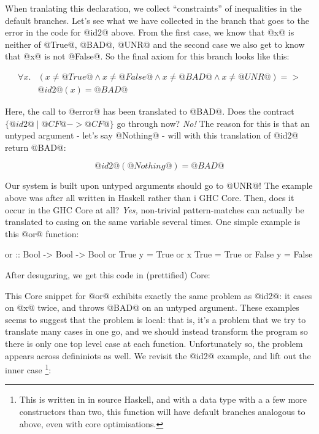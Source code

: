 When tranlating this declaration, we collect ``constraints'' of
inequalities in the default branches. Let's see what we have collected
in the branch that goes to the error in the code for @id2@ above.
From the first case, we know that @x@ is neither of @True@, @BAD@,
@UNR@ and the second case we also get to know that @x@ is not
@False@. So the final axiom for this branch looks like this:

\[\begin{array}{rl}
\forall x . &
    (x \neq @True@ \land
     x \neq @False@ \land
     x \neq @BAD@ \land
     x \neq @UNR@) =>  \\ & @id2@(x) = @BAD@
\end{array}\]

Here, the call to @error@ has been translated to @BAD@. Does the
contract $\{ @id2@ \mid @CF@ -> @CF@ \}$ go through now? \emph{No!}
The reason for this is that an untyped argument - let's say @Nothing@ -
will with this translation of @id2@ return @BAD@:

$$@id2@(@Nothing@) = @BAD@$$

Our system is built upon untyped arguments should go to @UNR@!  The
example above was after all written in Haskell rather than i GHC Core.
Then, does it occur in the GHC Core at all? \emph{Yes,} non-trivial
pattern-matches can actually be translated to casing on the same
variable several times. One simple example is this @or@ function:

\begin{code}
    or :: Bool -> Bool -> Bool
    or True  y    = True
    or x     True = True
    or False y    = False
\end{code}

After desugaring, we get this code in (prettified) Core:

\begin{code}
or :: Bool -> Bool -> Ok
or = \ (x :: Bool) (y :: Bool) ->
    case x of {
        True -> True
        _ -> case y of {
            True -> True
            _ -> case x of {
                False -> False
                _ -> patError "function or"
\end{code}

This Core snippet for @or@ exhibits exactly the same problem as @id2@:
it cases on @x@ twice, and throws @BAD@ on an untyped argument.  These
examples seems to suggest that the problem is local: that is, it's a
problem that we try to translate many cases in one go, and we should
instead transform the program so there is only one top level case at
each function. Unfortunately so, the problem appears across
defininiots as well. We revisit the @id2@ example, and lift out the
inner case
\footnote{This is written in in source Haskell, and with a data type
  with a a few more constructors than two, this function will have
  default branches analogous to above, even with core optimisations.
}:

